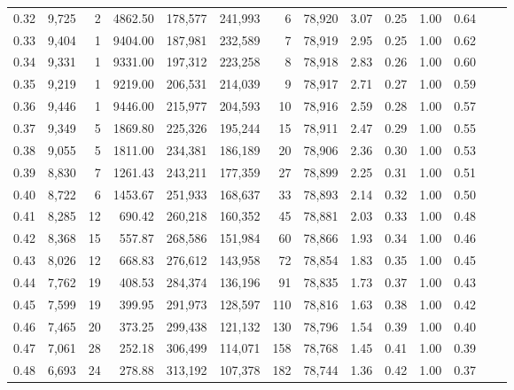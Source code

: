 \begin{tabular}{rrrrrrrrrrrrrr}
0.32 &  9,725 &      2 &  4862.50 &  178,577 &  241,993 &       6 &  78,920 &  3.07 &  0.25 &  1.00 &      0.64 \\
0.33 &  9,404 &      1 &  9404.00 &  187,981 &  232,589 &       7 &  78,919 &  2.95 &  0.25 &  1.00 &      0.62 \\
0.34 &  9,331 &      1 &  9331.00 &  197,312 &  223,258 &       8 &  78,918 &  2.83 &  0.26 &  1.00 &      0.60 \\
0.35 &  9,219 &      1 &  9219.00 &  206,531 &  214,039 &       9 &  78,917 &  2.71 &  0.27 &  1.00 &      0.59 \\
0.36 &  9,446 &      1 &  9446.00 &  215,977 &  204,593 &      10 &  78,916 &  2.59 &  0.28 &  1.00 &      0.57 \\
0.37 &  9,349 &      5 &  1869.80 &  225,326 &  195,244 &      15 &  78,911 &  2.47 &  0.29 &  1.00 &      0.55 \\
0.38 &  9,055 &      5 &  1811.00 &  234,381 &  186,189 &      20 &  78,906 &  2.36 &  0.30 &  1.00 &      0.53 \\
0.39 &  8,830 &      7 &  1261.43 &  243,211 &  177,359 &      27 &  78,899 &  2.25 &  0.31 &  1.00 &      0.51 \\
0.40 &  8,722 &      6 &  1453.67 &  251,933 &  168,637 &      33 &  78,893 &  2.14 &  0.32 &  1.00 &      0.50 \\
0.41 &  8,285 &     12 &   690.42 &  260,218 &  160,352 &      45 &  78,881 &  2.03 &  0.33 &  1.00 &      0.48 \\
0.42 &  8,368 &     15 &   557.87 &  268,586 &  151,984 &      60 &  78,866 &  1.93 &  0.34 &  1.00 &      0.46 \\
0.43 &  8,026 &     12 &   668.83 &  276,612 &  143,958 &      72 &  78,854 &  1.83 &  0.35 &  1.00 &      0.45 \\
0.44 &  7,762 &     19 &   408.53 &  284,374 &  136,196 &      91 &  78,835 &  1.73 &  0.37 &  1.00 &      0.43 \\
0.45 &  7,599 &     19 &   399.95 &  291,973 &  128,597 &     110 &  78,816 &  1.63 &  0.38 &  1.00 &      0.42 \\
0.46 &  7,465 &     20 &   373.25 &  299,438 &  121,132 &     130 &  78,796 &  1.54 &  0.39 &  1.00 &      0.40 \\
0.47 &  7,061 &     28 &   252.18 &  306,499 &  114,071 &     158 &  78,768 &  1.45 &  0.41 &  1.00 &      0.39 \\
0.48 &  6,693 &     24 &   278.88 &  313,192 &  107,378 &     182 &  78,744 &  1.36 &  0.42 &  1.00 &      0.37 \\

\end{tabular}
